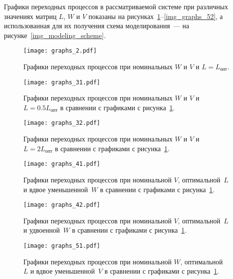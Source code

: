 Графики переходных процессов в рассматриваемой системе при различных значениях матриц $L$, $W$ и $V$ показаны на рисунках~\ref{img_graphs_2}--\ref{img_graphs_52},
а использованная для их получения схема моделирования~--- на рисунке~\ref{img_modeling_scheme}.

\begin{figure}[h!]
    \centering
    \texttt{[image: graphs\_2.pdf]}
    \vspace{0cm}
    \caption{Графики переходных процессов при номинальных $W$ и $V$ и $L = L_\text{опт}$.}
    \label{img_graphs_2}
\end{figure}

\begin{figure}[h!]
    \centering
    \texttt{[image: graphs\_31.pdf]}
    \vspace{0cm}
    \caption{Графики переходных процессов при номинальных $W$ и $V$ и $L = 0.5 L_\text{опт}$ в сравнении с графиками с рисунка~\ref{img_graphs_2}.}
    \label{img_graphs_31}
\end{figure}

\begin{figure}[h!]
    \centering
    \texttt{[image: graphs\_32.pdf]}
    \vspace{0cm}
    \caption{Графики переходных процессов при номинальных $W$ и $V$ и $L = 2 L_\text{опт}$ в сравнении с графиками с рисунка~\ref{img_graphs_2}.}
    \label{img_graphs_32}
\end{figure}

\begin{figure}[h!]
    \centering
    \texttt{[image: graphs\_41.pdf]}
    \vspace{0cm}
    \caption{Графики переходных процессов при номинальной $V$, оптимальной~$L$ и вдвое уменьшенной~$W$ в сравнении с графиками с рисунка~\ref{img_graphs_2}.}
    \label{img_graphs_41}
\end{figure}

\begin{figure}[h!]
    \centering
    \texttt{[image: graphs\_42.pdf]}
    \vspace{0cm}
    \caption{Графики переходных процессов при номинальной $V$, оптимальной~$L$ и удвоенной~$W$ в сравнении с графиками с рисунка~\ref{img_graphs_2}.}
    \label{img_graphs_42}
\end{figure}

\begin{figure}[h!]
    \centering
    \texttt{[image: graphs\_51.pdf]}
    \vspace{0cm}
    \caption{Графики переходных процессов при номинальной $W$, оптимальной~$L$ и вдвое уменьшенной~$V$ в сравнении с графиками с рисунка~\ref{img_graphs_2}.}
    \label{img_graphs_51}
\end{figure}

